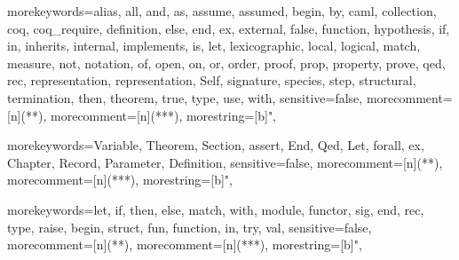 \newcommand{\ocaml}{{\sf OCaml}}
\newcommand{\moca}{{\sf Moca}}
\newcommand{\focal}{{\sf FoCaL}}
\newcommand{\coq}{{\sf Coq}}
\newcommand{\cime}{{\sf CiME}}
\newcommand{\latex}{{\sf LaTeX}}
\newcommand{\zenon}{{\sf Zenon}}
\newcommand{\ocamldoc}{{\sf ocamldoc}}
\newcommand{\ocamlyacc}{{\sf ocamlyacc}}
\newcommand{\ocamllex}{{\sf ocamllex}}
\newcommand{\gcc}{{\sf gcc}}
\newcommand{\focdoc}{\textsc{focdoc}}
\newcommand{\focalize}{{\sf FoCaLize}}
\newcommand{\focalizedoc}{{\sf FoCaLizeDoc}}
\newcommand{\focalizec}{{\sf focalizec}}
\newcommand{\focalizedep}{{\sf focalizedep}}
\newcommand{\decldeps}[1] {\lbag\ #1\rbag}
\newcommand{\defdeps}[1]
  {\lbag\hspace{-0.2cm}\lbag\ #1\rbag\hspace{-0.2cm}\rbag}

  {morekeywords={alias, all, and, as, assume, assumed, begin, by, caml,
      collection, coq, coq_require, definition, else, end,
      ex, external, false, function, hypothesis, if, in,
      inherits, internal, implements, is, let, lexicographic,
      local, logical, match, measure, not, notation, of, open,
      on, or, order, proof, prop, property, prove, qed, rec,
      representation, representation, Self, signature, species, step,
      structural, termination, then, theorem, true, type, use,
      with},
    sensitive=false,
    morecomment=[n]{(*}{*)},  %
    morecomment=[n]{(**}{*)},  %
    morestring=[b]",
  }

\newcommand{\setlangfocalize}{
\lstset{
  language=Focal, tabsize=2, frame=single, breaklines=true,
  basicstyle=\ttfamily, framexleftmargin=1mm, xleftmargin=1mm
}
}
\setlangfocalize


  {morekeywords={Variable, Theorem, Section, assert, End, Qed, Let,
      forall, ex, Chapter, Record, Parameter, Definition},
    sensitive=false,
    morecomment=[n]{(*}{*)},   %
    morecomment=[n]{(**}{*)},  %
    morestring=[b]",
  }

\newcommand{\setlangcoq}{
\lstset{
  language=Coq, tabsize=2, frame=single, breaklines=true,
  basicstyle=\ttfamily, framexleftmargin=1mm, xleftmargin=1mm
}
}



  {morekeywords={let, if, then, else, match, with, module,
      functor, sig, end, rec, type, raise, begin, struct, fun, function,
      in, try, val},
    sensitive=false,
    morecomment=[n]{(*}{*)},   %
    morecomment=[n]{(**}{*)},  %
    morestring=[b]",
  }

\newcommand{\setlangocaml}{
\lstset{
  language=MyOCaml, tabsize=2, frame=single, breaklines=true,
  basicstyle=\ttfamily, framexleftmargin=1mm, xleftmargin=1mm
}
}
